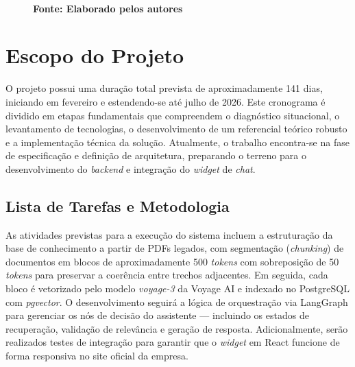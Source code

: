 \documentclass[a4paper,12pt,Times]{article}
\begin{document}
\begin{figure}[ht]
  \vspace{0.2cm}
  \\\textbf{\footnotesize Fonte: Elaborado pelos autores}
  \label{fig:pipeline}
\end{figure}


\section{Escopo do Projeto}

O projeto possui uma duração total prevista de aproximadamente 141 dias, iniciando em
fevereiro e estendendo-se até julho de 2026. Este cronograma é dividido em etapas
fundamentais que compreendem o diagnóstico situacional, o levantamento de tecnologias,
o desenvolvimento de um referencial teórico robusto e a implementação técnica da solução.
Atualmente, o trabalho encontra-se na fase de especificação e definição de arquitetura,
preparando o terreno para o desenvolvimento do \textit{backend} e integração do
\textit{widget} de \textit{chat}.

\subsection{Lista de Tarefas e Metodologia}

As atividades previstas para a execução do sistema incluem a estruturação da base de
conhecimento a partir de PDFs legados, com segmentação (\textit{chunking}) de documentos
em blocos de aproximadamente 500 \textit{tokens} com sobreposição de 50 \textit{tokens}
para preservar a coerência entre trechos adjacentes. Em seguida, cada bloco é vetorizado
pelo modelo \textit{voyage-3} da Voyage AI e indexado no PostgreSQL com \textit{pgvector}.
O desenvolvimento seguirá a lógica de orquestração via LangGraph para gerenciar os nós de
decisão do assistente — incluindo os estados de recuperação, validação de relevância e
geração de resposta. Adicionalmente, serão realizados testes de integração para garantir
que o \textit{widget} em React funcione de forma responsiva no site oficial da empresa.
\end{document}
